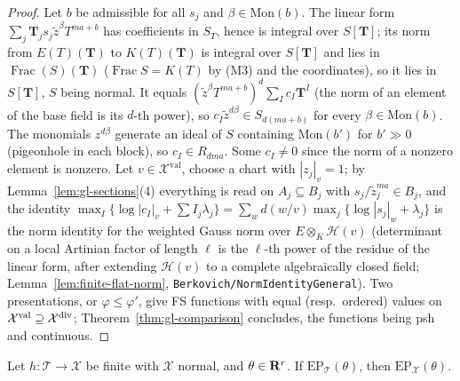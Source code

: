 \begin{proof}
Let $b$ be admissible for all $s_j$ and $\beta\in\mathrm{Mon}(b)$. The linear form $\sum_j\mathbf T_js_j\tilde z^\beta T^{ma+b}$ has coefficients in $S_T$, hence is
integral over $S[\mathbf T]$; its norm from $E(T)(\mathbf T)$ to $K(T)(\mathbf T)$ is integral over $S[\mathbf T]$ and lies in $\operatorname{Frac}(S)(\mathbf T)$
($\operatorname{Frac}S=K(T)$ by (M3) and the coordinates), so it lies in $S[\mathbf T]$, $S$ being normal. It equals
$(\tilde z^\beta T^{ma+b})^d\sum_Ic_I\mathbf T^I$ (the norm of an element of the base field is its $d$-th power), so $c_I\tilde z^{d\beta}\in S_{d(ma+b)}$ for every
$\beta\in\mathrm{Mon}(b)$. The monomials $z^{d\beta}$ generate an ideal of $S$ containing $\mathrm{Mon}(b')$ for $b'\gg0$ (pigeonhole in each block), so $c_I\in
R_{dma}$. Some $c_I\ne0$ since the norm of a nonzero element is nonzero. Let $v\in\mathcal X^{\mathrm{val}}$, choose a chart with $|z_j|_v=1$; by
Lemma~\ref{lem:gl-sections}(4) everything is read on $A_j\subseteq B_j$ with $s_j/\tilde z_j^{ma}\in B_j$, and the identity
$\max_I\{\log|c_I|_v+\sum I_j\lambda_j\}=\sum_wd(w/v)\max_j\{\log|s_j|_w+\lambda_j\}$ is the norm identity for the weighted Gauss norm over
$E\otimes_K\mathcal H(v)$ (determinant on a local Artinian factor of length $\ell$ is the $\ell$-th power of the residue of the linear form, after extending
$\mathcal H(v)$ to a complete algebraically closed field; Lemma~\ref{lem:finite-flat-norm}, \texttt{Berkovich/NormIdentityGeneral}). Two presentations, or
$\varphi\le\varphi'$, give FS functions with equal (resp.\ ordered) values on $\mathcal X^{\mathrm{val}}\supseteq\mathcal X^{\mathrm{div}}$; Theorem~\ref{thm:gl-comparison}
concludes, the functions being psh and continuous.
\end{proof}

\begin{theorem}\label{thm:gl-finite-descent}
\leanok
{}
Let $h\colon\mathcal T\to\mathcal X$ be finite with $\mathcal X$ normal, and $\theta\in\mathbf{R}^r$. If $\mathrm{EP}_{\mathcal T}(\theta)$, then
$\mathrm{EP}_{\mathcal X}(\theta)$.
\end{theorem}

